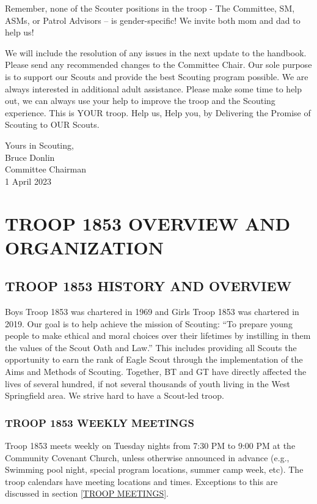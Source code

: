 \documentclass{ltxguide}
\begin{document}
Remember, none of the Scouter positions in the troop - The Committee, \ac{SM}, \acp{ASM}, or Patrol Advisors -- is gender-specific! We invite both mom and dad to help us!

We will include the resolution of any issues in the next update to the handbook. Please send any recommended changes to the Committee Chair. Our sole purpose is to support our Scouts and provide the best Scouting program possible. We are always interested in additional adult assistance. Please make some time to help out, we can always use your help to improve the troop and the Scouting experience. This is YOUR troop. Help us, Help you, by Delivering the Promise of Scouting to OUR Scouts.



Yours in Scouting,\\ 
Bruce Donlin\\ 
Committee Chairman\\ 
1 April 2023

\newpage
\tableofcontents

\newpage


\section{TROOP 1853 OVERVIEW AND ORGANIZATION}

\subsection{TROOP 1853 HISTORY AND OVERVIEW}
Boys Troop 1853 was chartered in 1969 and Girls Troop 1853 was chartered in 2019. Our goal is to help achieve the mission of Scouting: “To prepare young people to make ethical and moral choices over their lifetimes by instilling in them the values of the Scout Oath and Law.” This includes providing all Scouts the opportunity to earn the rank of Eagle Scout through the implementation of the Aims and Methods of Scouting. Together, \ac{BT} and \ac{GT} have directly affected the lives of several hundred, if not several thousands of youth living in the West Springfield area. We strive hard to have a Scout-led troop.

\subsubsection{TROOP 1853 WEEKLY MEETINGS}
Troop 1853 meets weekly on Tuesday nights from 7:30 PM to 9:00 PM at the Community Covenant Church, unless otherwise announced in advance (e.g., Swimming pool night, special program locations, summer camp week, etc). The troop calendars have meeting locations and times. Exceptions to this are discussed in section \ref{TROOP MEETINGS}.
\end{document}
